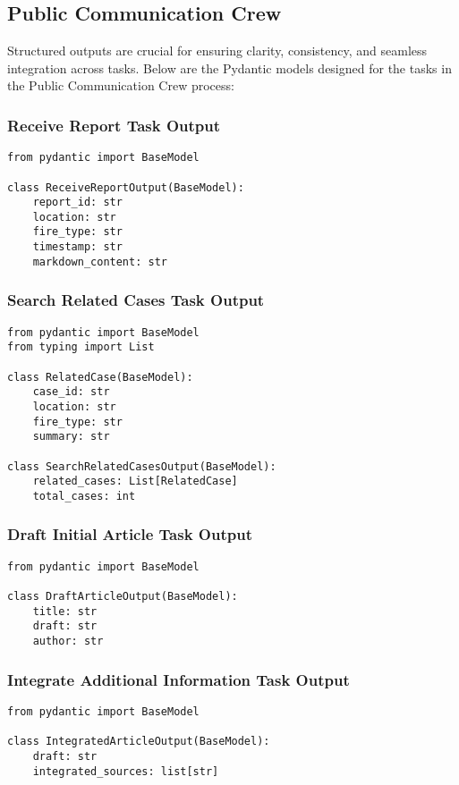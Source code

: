 \subsection{Public Communication Crew}

Structured outputs are crucial for ensuring clarity, consistency, and seamless integration across tasks. Below are the Pydantic models designed for the tasks in the Public Communication Crew process:

\subsubsection{Receive Report Task Output}
\begin{lstlisting}[caption={Pydantic model for Receive Report Task Output}]
from pydantic import BaseModel

class ReceiveReportOutput(BaseModel):
    report_id: str
    location: str
    fire_type: str
    timestamp: str
    markdown_content: str
\end{lstlisting}

\subsubsection{Search Related Cases Task Output}
\begin{lstlisting}[caption={Pydantic model for Search Related Cases Task Output}]
from pydantic import BaseModel
from typing import List

class RelatedCase(BaseModel):
    case_id: str
    location: str
    fire_type: str
    summary: str

class SearchRelatedCasesOutput(BaseModel):
    related_cases: List[RelatedCase]
    total_cases: int
\end{lstlisting}

\subsubsection{Draft Initial Article Task Output}
\begin{lstlisting}[caption={Pydantic model for Draft Initial Article Task Output}]
from pydantic import BaseModel

class DraftArticleOutput(BaseModel):
    title: str
    draft: str
    author: str
\end{lstlisting}

\subsubsection{Integrate Additional Information Task Output}
\begin{lstlisting}[caption={Pydantic model for Integrate Additional Information Task Output}]
from pydantic import BaseModel

class IntegratedArticleOutput(BaseModel):
    draft: str
    integrated_sources: list[str]
\end{lstlisting}

